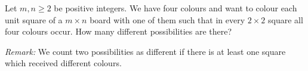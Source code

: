 Let $m, n \geq 2$ be positive integers. We have four colours and want to colour each unit square of a $m \times n$ board with one of them such that in every $2 \times 2$ square all four colours occur. How many different possibilities are there?

\textit{Remark:} We count two possibilities as different if there is at least one square which received different colours.